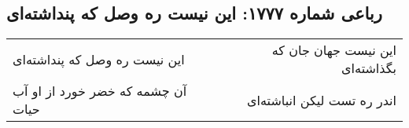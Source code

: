 \begin{center}
\section*{رباعی شماره ۱۷۷۷: این نیست ره وصل که پنداشته‌ای}
\label{sec:1777}
\begin{longtable}{l p{0.5cm} r}
این نیست ره وصل که پنداشته‌ای
&&
این نیست جهان جان که بگذاشته‌ای
\\
آن چشمه که خضر خورد از او آب حیات
&&
اندر ره تست لیکن انباشته‌ای
\\
\end{longtable}
\end{center}
